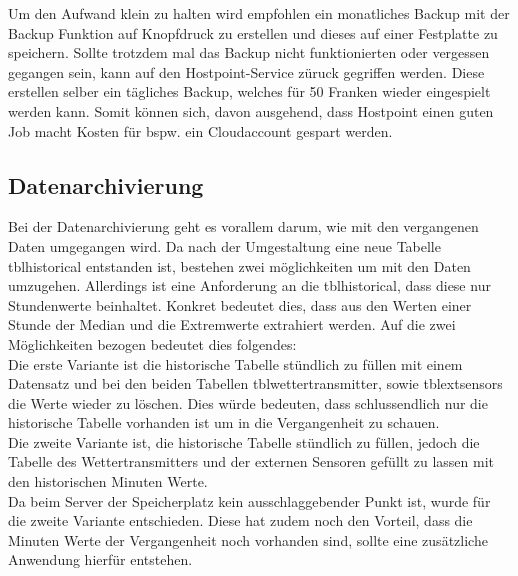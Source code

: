 Um den Aufwand klein zu halten wird empfohlen ein monatliches Backup mit der Backup Funktion auf Knopfdruck zu erstellen und dieses auf einer Festplatte zu speichern. Sollte trotzdem mal das Backup nicht funktionierten oder vergessen gegangen sein, kann auf den Hostpoint-Service züruck gegriffen werden. Diese erstellen selber ein tägliches Backup, welches für 50 Franken wieder eingespielt werden kann. Somit können sich, davon ausgehend, dass Hostpoint einen guten Job macht Kosten für bspw. ein Cloudaccount gespart werden.


\subsection{Datenarchivierung}

Bei der Datenarchivierung geht es vorallem darum, wie mit den vergangenen Daten umgegangen wird. Da nach der Umgestaltung eine neue Tabelle tblhistorical entstanden ist, bestehen zwei möglichkeiten um mit den Daten umzugehen. Allerdings ist eine Anforderung an die tblhistorical, dass diese nur Stundenwerte beinhaltet. Konkret bedeutet dies, dass aus den Werten einer Stunde der Median und die Extremwerte extrahiert werden. Auf die zwei Möglichkeiten bezogen bedeutet dies folgendes: \\
Die erste Variante ist die historische Tabelle stündlich zu füllen mit einem Datensatz und bei den beiden Tabellen tblwettertransmitter, sowie tblextsensors die Werte wieder zu löschen. Dies würde bedeuten, dass schlussendlich nur die historische Tabelle vorhanden ist um in die Vergangenheit zu schauen.\\
Die zweite Variante ist, die historische Tabelle stündlich zu füllen, jedoch die Tabelle des Wettertransmitters und der externen Sensoren gefüllt zu lassen mit den historischen Minuten Werte.\\
Da beim Server der Speicherplatz kein ausschlaggebender Punkt ist, wurde für die zweite Variante entschieden. Diese hat zudem noch den Vorteil, dass die Minuten Werte der Vergangenheit noch vorhanden sind, sollte eine zusätzliche Anwendung hierfür entstehen. 



